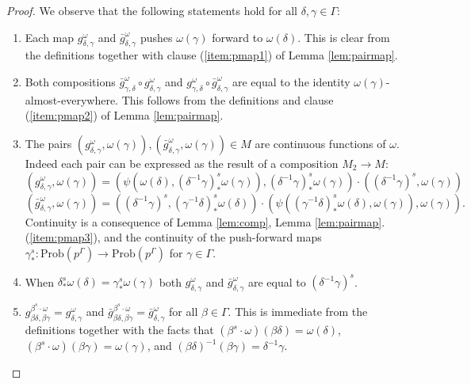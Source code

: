 \documentclass[10pt,a4paper]{amsart}
\newcommand{\Prob}{\mathrm{Prob}}
\begin{document}
\begin{proof}
	We observe that the following statements hold for all $\delta, \gamma \in \Gamma$:
	\begin{enumerate}
		\item \label{proofitem:fmap1} Each map $g_{\delta,\gamma}^\omega$ and $\bar g_{\delta, \gamma}^\omega$ pushes $\omega(\gamma)$ forward to $\omega(\delta)$. This is clear from the definitions together with clause (\ref{item:pmap1}) of Lemma \ref{lem:pairmap}.
		\item \label{proofitem:fmap2} \indent Both compositions $\bar g_{\gamma, \delta}^\omega \circ g_{\delta, \gamma}^\omega$ and $g_{\gamma, \delta}^\omega \circ \bar g_{\delta, \gamma}^\omega$ are equal to the identity $\omega(\gamma)$-almost-everywhere. This follows from the definitions and clause (\ref{item:pmap2}) of Lemma \ref{lem:pairmap}.
		\item \label{proofitem:fmap3} The pairs $(g_{\delta, \gamma}^\omega, \omega(\gamma)), (\bar g_{\delta, \gamma}^\omega, \omega(\gamma)) \in M$ are continuous functions of $\omega$. Indeed each pair can be expressed as the result of a composition $M_2 \rightarrow M$:
		\[(g_{\delta, \gamma}^\omega, \omega(\gamma)) = (\psi(\omega(\delta), (\delta^{-1} \gamma)^s_* \omega(\gamma)), (\delta^{-1} \gamma)^s_* \omega(\gamma)) \cdot ((\delta^{-1} \gamma)^s, \omega(\gamma))\]
		\[(\bar g_{\delta, \gamma}^\omega, \omega(\gamma)) = ((\delta^{-1} \gamma)^s, (\gamma^{-1} \delta)^s_* \omega(\delta)) \cdot (\psi((\gamma^{-1} \delta)^s_* \omega(\delta), \omega(\gamma)), \omega(\gamma)).\]
		Continuity is a consequence of Lemma \ref{lem:comp}, Lemma \ref{lem:pairmap}.(\ref{item:pmap3}), and the continuity of the push-forward maps $\gamma^s_* : \Prob(p^\Gamma) \rightarrow \Prob(p^\Gamma)$ for $\gamma \in \Gamma$.
		\item \label{proofitem:fmap4} When $\delta^s_* \omega(\delta) = \gamma^s_* \omega(\gamma)$ both $g_{\delta, \gamma}^\omega$ and $\bar g_{\delta, \gamma}^\omega$ are equal to $(\delta^{-1} \gamma)^s$.
		\item \label{proofitem:fmapa} $g_{\beta \delta, \beta \gamma}^{\beta^s \cdot \omega} = g_{\delta, \gamma}^\omega$ and $\bar g_{\beta \delta, \beta \gamma}^{\beta^s \cdot \omega} = \bar g_{\delta, \gamma}^\omega$ for all $\beta \in \Gamma$. This is immediate from the definitions together with the facts that $(\beta^s \cdot \omega)(\beta \delta) = \omega(\delta)$, $(\beta^s \cdot \omega)(\beta \gamma) = \omega(\gamma)$, and $(\beta \delta)^{-1} (\beta \gamma) = \delta^{-1} \gamma$.
	\end{enumerate}
	

\end{proof}
\end{document}
